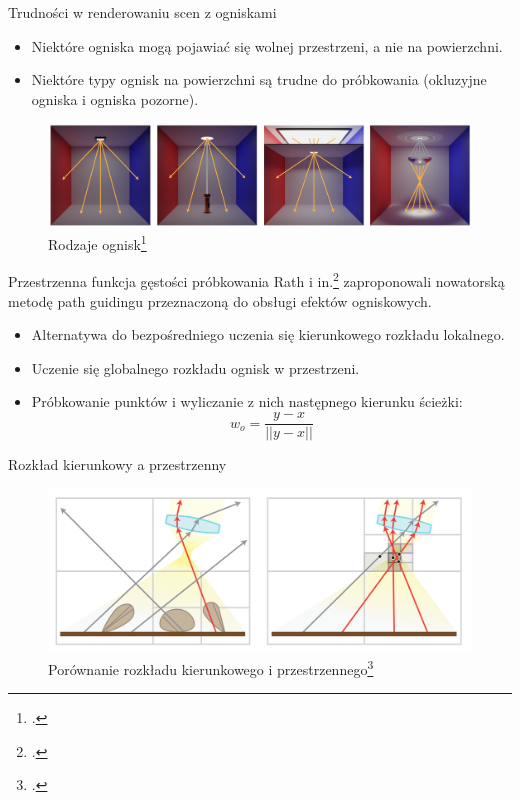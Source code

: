 \documentclass{beamer}
\begin{document}
\begin{frame}{Trudności w renderowaniu scen z ogniskami}
    \begin{itemize}
        \item Niektóre ogniska mogą pojawiać się wolnej przestrzeni, a nie na powierzchni.
        \item Niektóre typy ognisk na powierzchni są trudne do próbkowania (okluzyjne ogniska i ogniska pozorne).
    \end{itemize}
    \begin{figure}
        \centering
        \includegraphics[width=0.8\linewidth]{img/focal_effects.png}
        \caption{Rodzaje ognisk\footcite{Focal_Guiding}}
        \label{fig:enter-label}
    \end{figure}
\end{frame}
%

\begin{frame}{Przestrzenna funkcja gęstości próbkowania}
Rath i in.\footcite{Focal_Guiding} zaproponowali nowatorską metodę path guidingu przeznaczoną do obsługi efektów ogniskowych.
    \begin{itemize}
        \item Alternatywa do bezpośredniego uczenia się kierunkowego rozkładu lokalnego.
        \item Uczenie się globalnego rozkładu ognisk w przestrzeni.
        \item Próbkowanie punktów i wyliczanie z nich następnego kierunku ścieżki:
        $$ w_o = \frac{y-x}{||y-x||} $$
    \end{itemize}
\end{frame}

\begin{frame}{Rozkład kierunkowy a przestrzenny}
    \begin{figure}
        \centering
        \includegraphics[width=1\linewidth]{img/directional_vs_spatial.png}
        \caption{Porównanie rozkładu kierunkowego i przestrzennego\footcite{Focal_Guiding}}
        \label{fig:enter-label}
    \end{figure}
\end{frame}
\end{document}
